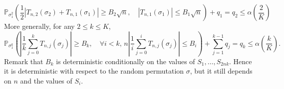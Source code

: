 \documentclass{article}
\theoremstyle{plain}
\theoremstyle{remark}
\renewcommand{\P}{\mathbb{P}}
\newcommand{\1}{\mathbbm{1}}
\numberwithin{equation}{section}
\begin{document}
$$\P_{\sigma_1^2}\left( \frac{1}{2}|T_{n,2}(\sigma_2)+T_{n,1}(\sigma_1)|\ge  B_2\sqrt{n},\quad  |T_{n,1}(\sigma_1)|\le  B_1\sqrt{n}  \right)+q_1 = q_2 \le\alpha\left(\frac{2}{K}\right) $$
More generally, for any $2\le k\le K$,
\begin{equation}\label{eq:def_Bk}
\P_{\sigma_1^k}\left(\left|\frac{1}{k}\sum_{j=0}^k T_{n,j}(\sigma_j)\right|\ge B_{k}, \quad \forall i < k,\,  n\left|\frac{1}{i}\sum_{j=0}^i T_{n,j}\left(\sigma_j\right)\right|\le  B_i\right)+\sum_{j=1}^{k-1}q_j  = q_k \le\alpha\left(\frac{k}{K}\right).
\end{equation}
Remark that $B_k$ is deterministic conditionally on the values of $S_1,\dots,S_{2nk}$. Hence it is deterministic with respect to the random permutation $\sigma$, but it still depends on $n$ and the values of $S_i$.
\end{document}
